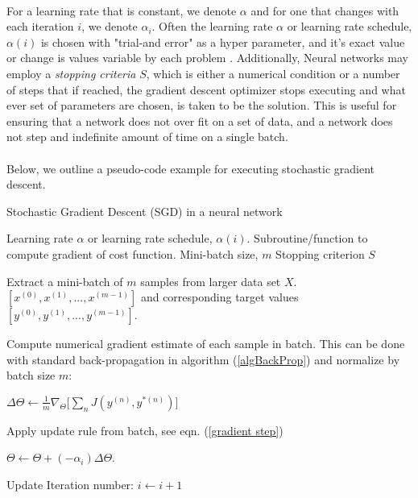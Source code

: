 \documentclass[12pt,letterpaper]{article}
\begin{document}
\paragraph*{}For a learning rate that is constant, we denote $\alpha$ and for one that changes with each iteration $i$, we denote $\alpha_i$. Often the learning rate $\alpha$ or learning rate schedule, $\alpha(i)$ is chosen with "trial-and error" as a hyper parameter, and it's exact value or change is values variable by each problem \cite{Goodfellow}. Additionally, Neural networks may employ a \textit{stopping criteria} $S$, which is either a numerical condition or a number of steps that if reached, the gradient descent optimizer stops executing and what ever set of parameters are chosen, is taken to be the solution. This is useful for ensuring that a network does not over fit on a set of data, and a network does not step and indefinite amount of time on a single batch.

\paragraph*{}Below, we outline a pseudo-code example for executing stochastic gradient descent.

\begin{algorithm}
\caption{Stochastic Gradient Descent (SGD) in a neural network}
\label{algSGD}

\begin{algorithmic}

\REQUIRE Learning rate $\alpha$ or learning rate schedule, $\alpha(i)$.
\REQUIRE Subroutine/function to compute gradient of cost function.
\REQUIRE Mini-batch size, $m$
\REQUIRE Stopping criterion $S$

	\item Extract a mini-batch of $m$ samples from larger data set $X$. $[x^{(0)},x^{(1)},...,x^{(m-1)}]$ and corresponding target values 
	$[y^{(0)},y^{(1)},...,y^{(m-1)}]$.
	\item Compute numerical gradient estimate of each sample in batch. This can be done with standard back-propagation in algorithm (\ref{algBackProp}) and 			 	normalize by batch size $m$:
	\item $\Delta\Theta \leftarrow \frac{1}{m}\nabla_{\Theta} \Big[ \sum_n J(y^{(n)},y^{*(n)}) \Big] $
	\item Apply update rule from batch, see eqn. (\ref{gradient step})
	\item $\Theta \leftarrow \Theta + (-\alpha_i) \Delta\Theta$.	
	\item Update Iteration number: $i \leftarrow i + 1$
\ENDWHILE

\end{algorithmic}
\end{algorithm}
\end{document}
